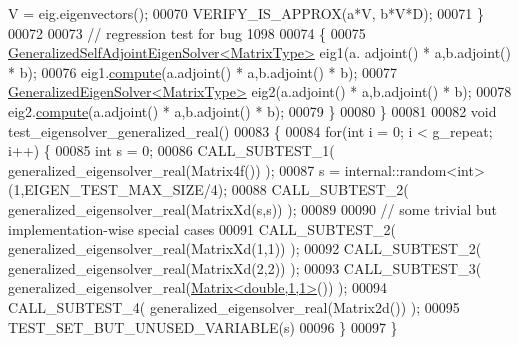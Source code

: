 \begin{DoxyCode}
       V = eig.eigenvectors();
00070     VERIFY\_IS\_APPROX(a*V, b*V*D);
00071   \}
00072 
00073   \textcolor{comment}{// regression test for bug 1098}
00074   \{
00075     \hyperlink{group___eigenvalues___module_class_eigen_1_1_generalized_self_adjoint_eigen_solver}{GeneralizedSelfAdjointEigenSolver<MatrixType>} eig1(a.
      adjoint() * a,b.adjoint() * b);
00076     eig1.\hyperlink{group___eigenvalues___module_a724764fe196612b752042692156ed023}{compute}(a.adjoint() * a,b.adjoint() * b);
00077     \hyperlink{group___eigenvalues___module_class_eigen_1_1_generalized_eigen_solver}{GeneralizedEigenSolver<MatrixType>} eig2(a.adjoint() * a,b.adjoint() *
       b);
00078     eig2.\hyperlink{group___eigenvalues___module_a275910b47dfe5f40211dcb59cfd68f3c}{compute}(a.adjoint() * a,b.adjoint() * b);
00079   \}
00080 \}
00081 
00082 \textcolor{keywordtype}{void} test\_eigensolver\_generalized\_real()
00083 \{
00084   \textcolor{keywordflow}{for}(\textcolor{keywordtype}{int} i = 0; i < g\_repeat; i++) \{
00085     \textcolor{keywordtype}{int} s = 0;
00086     CALL\_SUBTEST\_1( generalized\_eigensolver\_real(Matrix4f()) );
00087     s = internal::random<int>(1,EIGEN\_TEST\_MAX\_SIZE/4);
00088     CALL\_SUBTEST\_2( generalized\_eigensolver\_real(MatrixXd(s,s)) );
00089 
00090     \textcolor{comment}{// some trivial but implementation-wise special cases}
00091     CALL\_SUBTEST\_2( generalized\_eigensolver\_real(MatrixXd(1,1)) );
00092     CALL\_SUBTEST\_2( generalized\_eigensolver\_real(MatrixXd(2,2)) );
00093     CALL\_SUBTEST\_3( generalized\_eigensolver\_real(\hyperlink{group___core___module_class_eigen_1_1_matrix}{Matrix<double,1,1>}()) );
00094     CALL\_SUBTEST\_4( generalized\_eigensolver\_real(Matrix2d()) );
00095     TEST\_SET\_BUT\_UNUSED\_VARIABLE(s)
00096   \}
00097 \}
\end{DoxyCode}
